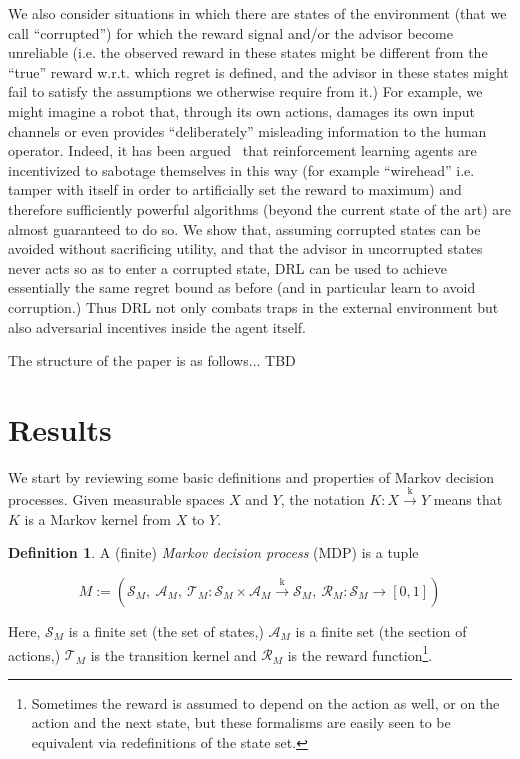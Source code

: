 \documentclass[11pt]{article}
\theoremstyle{definition}
\newtheorem{definition}{Definition}%
\theoremstyle{plain}
\newcommand{\AP}[1]{\left(#1\right)}
\newcommand{\K}{\xrightarrow{\text{k}}}
\newcommand{\A}{\mathcal{A}}
\newcommand{\St}{\mathcal{S}}
\newcommand{\T}{\mathcal{T}}
\newcommand{\R}{\mathcal{R}}
\begin{document}
We also consider situations in which there are states of the environment (that we call \enquote{corrupted}) for which the reward signal and/or the advisor become unreliable (i.e. the observed reward in these states might be different from the \enquote{true} reward w.r.t. which regret is defined, and the advisor in these states might fail to satisfy the assumptions we otherwise require from it.) For example, we might imagine a robot that, through its own actions, damages its own input channels or even provides \enquote{deliberately} misleading information to the human operator. Indeed, it has been argued~\cite{TBD} that reinforcement learning agents are incentivized to sabotage themselves in this way (for example \enquote{wirehead} i.e. tamper with itself in order to artificially set the reward to maximum) and therefore sufficiently powerful algorithms (beyond the current state of the art) are almost guaranteed to do so. We show that, assuming corrupted states can be avoided without sacrificing utility, and that the advisor in uncorrupted states never acts so as to enter a corrupted state, DRL can be used to achieve essentially the same regret bound as before (and in particular learn to avoid corruption.) Thus DRL not only combats traps in the external environment but also adversarial incentives inside the agent itself.

The structure of the paper is as follows... TBD

\section{Results}

We start by reviewing some basic definitions and properties of Markov decision processes. Given measurable spaces $X$ and $Y$, the notation $K: X \K Y$ means that $K$ is a Markov kernel from $X$ to $Y$.

\begin{samepage}
\begin{definition}

A (finite) \emph{Markov decision process} (MDP) is a tuple

$$M:=\AP{\St_M,\ \A_M,\ \T_M: \St_M \times \A_M \K \St_M,\ \R_M: \St_M \rightarrow [0,1]}$$

Here, $\St_M$ is a finite set (the set of states,) $\A_M$ is a finite set (the section of actions,) $\T_M$ is the transition kernel and $\R_M$ is the reward function\footnote{Sometimes the reward is assumed to depend on the action as well, or on the action and the next state, but these formalisms are easily seen to be equivalent via redefinitions of the state set.}.

\end{definition}
\end{samepage}
\end{document}
